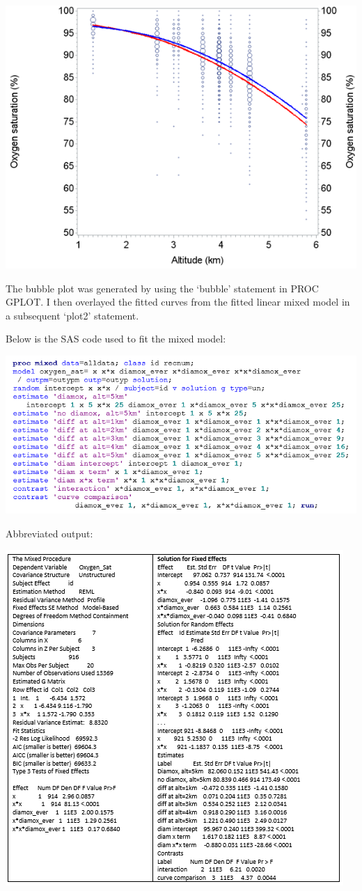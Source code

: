 \documentclass[
  9pt,
  ignorenonframetext,
]{beamer}
\begin{document}
\begin{frame}{}
\protect\hypertarget{section-10}{}
\begin{center}\includegraphics[width=0.6\linewidth]{figs_L7/f1} \end{center}

The bubble plot was generated by using the `bubble' statement in PROC
GPLOT. I then overlayed the fitted curves from the fitted linear mixed
model in a subsequent `plot2' statement.
\end{frame}

\begin{frame}{}
\protect\hypertarget{section-11}{}
Below is the SAS code used to fit the mixed model:

\begin{center}\includegraphics[width=0.6\linewidth]{figs_L7/f2} \end{center}
\end{frame}

\begin{frame}{Abbreviated output:}
\protect\hypertarget{abbreviated-output}{}
\begin{center}\includegraphics[width=0.6\linewidth]{figs_L7/f3} \end{center}
\end{frame}
\end{document}

